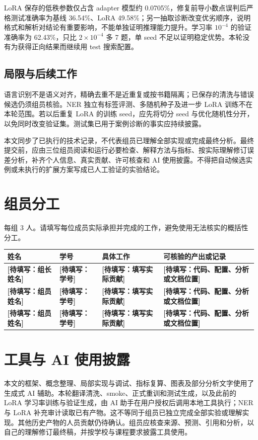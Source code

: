 \documentclass[UTF8,a4paper,12pt,fontset=none]{ctexart}
\newcommand{\todo}[1]{\textcolor{red!70!black}{\textbf{[待填写：#1]}}}
\begin{document}
LoRA 保存的低秩参数仅占含 adapter 模型约 0.0705\%，修复前导小数点误判后严格测试准确率为基线 36.54\%、LoRA 49.58\%；另一抽取诊断改变优劣顺序，说明格式和解析对结论有重要影响，不能单独证明推理能力提升。学习率 $10^{-4}$ 的验证准确率为 62.43\%，只比 $2\times10^{-4}$ 多 7 题，单 seed 不足以证明稳定优势。本轮没有为获得正向结果而继续用 test 搜索配置。

\subsection{局限与后续工作}
语言识别不是语义对齐，精确去重不是近重复或按书籍隔离；已保存的清洗与错误候选仍须组员核验。NER 独立有标签评测、多随机种子及进一步 LoRA 训练不在本轮范围。若以后重复 LoRA 的训练 seed，应先将切分 seed 与优化随机性分开，以免同时改变验证集。测试集已用于案例诊断的事实应持续披露。

本文同步了已执行的技术记录，不代表组员已理解全部实现或完成最终分析。最终提交前，应由三位组员阅读和运行必要检查、解释方法与指标、按实际理解修订误差分析，补齐个人信息、真实贡献、许可核查和 AI 使用披露。不得把自动候选实例或未执行的扩展方案写成已人工验证的实验结论。

\section{组员分工}

每组 3 人。请填写每位成员实际承担并完成的工作，避免使用无法核实的概括性分工。

\noindent\begin{tabularx}{\textwidth}{>{\raggedright\arraybackslash}p{}p{}YY}
\toprule
姓名 & 学号 & 具体工作 & 可核验的产出或记录 \\
\midrule
\todo{组长姓名} & \todo{学号} & \todo{填写实际贡献} & \todo{代码、配置、分析或文档位置} \\
\todo{组员姓名} & \todo{学号} & \todo{填写实际贡献} & \todo{代码、配置、分析或文档位置} \\
\todo{组员姓名} & \todo{学号} & \todo{填写实际贡献} & \todo{代码、配置、分析或文档位置} \\
\bottomrule
\end{tabularx}

\section*{工具与 AI 使用披露}
本文的框架、概念整理、局部实现与调试、指标复算、图表及部分分析文字使用了生成式 AI 辅助。本轮翻译清洗、smoke、正式重训和测试生成，以及此前的 LoRA 学习率训练与验证生成，由 AI 助手在用户授权后调用本地工具执行；NER 与 LoRA 补充审计读取已有产物。这不等同于组员已独立完成全部实验或理解实现。其他历史产物的人员贡献仍待确认。组员应核查来源、预测、引用和分析，以自己的理解修订最终稿，并按学校与课程要求披露工具使用。
\end{document}
